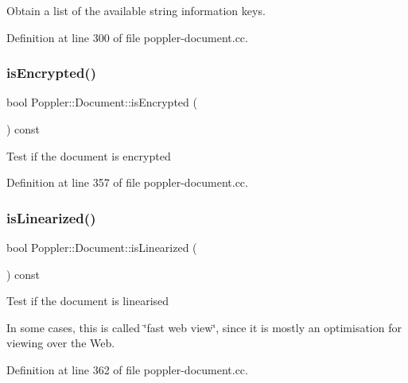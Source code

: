 Obtain a list of the available string information keys. 

Definition at line 300 of file poppler-\/document.\+cc.

\mbox{\label{class_poppler_1_1_document_aa14566ce82018b575cee3179fbb3f912}} 
\subsubsection{\texorpdfstring{is\+Encrypted()}{isEncrypted()}}
{\footnotesize\ttfamily bool Poppler\+::\+Document\+::is\+Encrypted (\begin{DoxyParamCaption}{ }\end{DoxyParamCaption}) const}

Test if the document is encrypted 

Definition at line 357 of file poppler-\/document.\+cc.

\mbox{\label{class_poppler_1_1_document_a0699e1c95414e826dbe2400305d6ba29}} 
\subsubsection{\texorpdfstring{is\+Linearized()}{isLinearized()}}
{\footnotesize\ttfamily bool Poppler\+::\+Document\+::is\+Linearized (\begin{DoxyParamCaption}{ }\end{DoxyParamCaption}) const}

Test if the document is linearised

In some cases, this is called \char`\"{}fast web view\char`\"{}, since it is mostly an optimisation for viewing over the Web. 

Definition at line 362 of file poppler-\/document.\+cc.

\mbox{\label{class_poppler_1_1_document_a21399ffda439d05aa493dceba9bf8c50}} 
